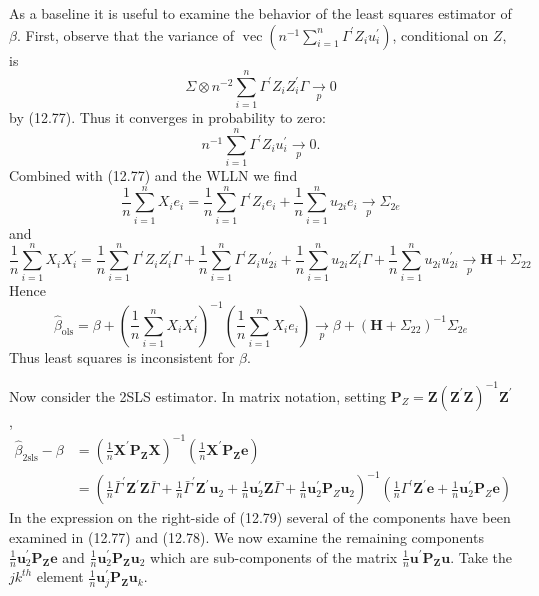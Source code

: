 \documentclass[10pt]{article}
\begin{document}
As a baseline it is useful to examine the behavior of the least squares estimator of $\beta$. First, observe that the variance of $\operatorname{vec}\left(n^{-1} \sum_{i=1}^{n} \Gamma^{\prime} Z_{i} u_{i}^{\prime}\right)$, conditional on $Z$, is
$$
\Sigma \otimes n^{-2} \sum_{i=1}^{n} \Gamma^{\prime} Z_{i} Z_{i}^{\prime} \Gamma \underset{p}{\longrightarrow} 0
$$
by (12.77). Thus it converges in probability to zero:
$$
n^{-1} \sum_{i=1}^{n} \Gamma^{\prime} Z_{i} u_{i}^{\prime} \underset{p}{\longrightarrow} 0 .
$$
Combined with (12.77) and the WLLN we find
$$
\frac{1}{n} \sum_{i=1}^{n} X_{i} e_{i}=\frac{1}{n} \sum_{i=1}^{n} \Gamma^{\prime} Z_{i} e_{i}+\frac{1}{n} \sum_{i=1}^{n} u_{2 i} e_{i} \underset{p}{\longrightarrow} \Sigma_{2 e}
$$
and
$$
\frac{1}{n} \sum_{i=1}^{n} X_{i} X_{i}^{\prime}=\frac{1}{n} \sum_{i=1}^{n} \Gamma^{\prime} Z_{i} Z_{i}^{\prime} \Gamma+\frac{1}{n} \sum_{i=1}^{n} \Gamma^{\prime} Z_{i} u_{2 i}^{\prime}+\frac{1}{n} \sum_{i=1}^{n} u_{2 i} Z_{i}^{\prime} \Gamma+\frac{1}{n} \sum_{i=1}^{n} u_{2 i} u_{2 i}^{\prime} \underset{p}{\rightarrow} \boldsymbol{H}+\Sigma_{22}
$$
Hence
$$
\widehat{\beta}_{\mathrm{ols}}=\beta+\left(\frac{1}{n} \sum_{i=1}^{n} X_{i} X_{i}^{\prime}\right)^{-1}\left(\frac{1}{n} \sum_{i=1}^{n} X_{i} e_{i}\right) \underset{p}{\longrightarrow} \beta+\left(\boldsymbol{H}+\Sigma_{22}\right)^{-1} \Sigma_{2 e}
$$
Thus least squares is inconsistent for $\beta$.

Now consider the 2SLS estimator. In matrix notation, setting $\boldsymbol{P}_{Z}=\boldsymbol{Z}\left(\boldsymbol{Z}^{\prime} \boldsymbol{Z}\right)^{-1} \boldsymbol{Z}^{\prime}$,
$$
\begin{aligned}
\widehat{\beta}_{2 \mathrm{sls}}-\beta &=\left(\frac{1}{n} \boldsymbol{X}^{\prime} \boldsymbol{P}_{\boldsymbol{Z}} \boldsymbol{X}\right)^{-1}\left(\frac{1}{n} \boldsymbol{X}^{\prime} \boldsymbol{P}_{\boldsymbol{Z}} \boldsymbol{e}\right) \\
&=\left(\frac{1}{n} \bar{\Gamma}^{\prime} \boldsymbol{Z}^{\prime} \boldsymbol{Z} \bar{\Gamma}+\frac{1}{n} \bar{\Gamma}^{\prime} \boldsymbol{Z}^{\prime} \boldsymbol{u}_{2}+\frac{1}{n} \boldsymbol{u}_{2}^{\prime} \boldsymbol{Z} \bar{\Gamma}+\frac{1}{n} \boldsymbol{u}_{2}^{\prime} \boldsymbol{P}_{Z} \boldsymbol{u}_{2}\right)^{-1}\left(\frac{1}{n} \Gamma^{\prime} \boldsymbol{Z}^{\prime} \boldsymbol{e}+\frac{1}{n} \boldsymbol{u}_{2}^{\prime} \boldsymbol{P}_{Z} \boldsymbol{e}\right)
\end{aligned}
$$
In the expression on the right-side of (12.79) several of the components have been examined in (12.77) and (12.78). We now examine the remaining components $\frac{1}{n} \boldsymbol{u}_{2}^{\prime} \boldsymbol{P}_{\boldsymbol{Z}} \boldsymbol{e}$ and $\frac{1}{n} \boldsymbol{u}_{2}^{\prime} \boldsymbol{P}_{\boldsymbol{Z}} \boldsymbol{u}_{2}$ which are sub-components of the matrix $\frac{1}{n} \boldsymbol{u}^{\prime} \boldsymbol{P}_{\boldsymbol{Z}} \boldsymbol{u}$. Take the $j k^{t h}$ element $\frac{1}{n} \boldsymbol{u}_{j}^{\prime} \boldsymbol{P}_{\boldsymbol{Z}} \boldsymbol{u}_{k}$.
\end{document}
